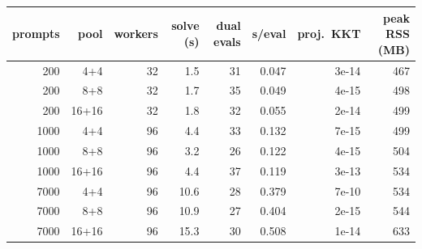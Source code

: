 \begin{tabular}{r r r r r r r r}
\toprule
prompts & pool & workers & solve (s) & dual evals & s/eval & proj.\ KKT & peak RSS (MB) \\
\midrule
200 & 4+4 & 32 & 1.5 & 31 & 0.047 & 3e-14 & 467 \\
200 & 8+8 & 32 & 1.7 & 35 & 0.049 & 4e-15 & 498 \\
200 & 16+16 & 32 & 1.8 & 32 & 0.055 & 2e-14 & 499 \\
1000 & 4+4 & 96 & 4.4 & 33 & 0.132 & 7e-15 & 499 \\
1000 & 8+8 & 96 & 3.2 & 26 & 0.122 & 4e-15 & 504 \\
1000 & 16+16 & 96 & 4.4 & 37 & 0.119 & 3e-13 & 534 \\
7000 & 4+4 & 96 & 10.6 & 28 & 0.379 & 7e-10 & 534 \\
7000 & 8+8 & 96 & 10.9 & 27 & 0.404 & 2e-15 & 544 \\
7000 & 16+16 & 96 & 15.3 & 30 & 0.508 & 1e-14 & 633 \\
\bottomrule
\end{tabular}

